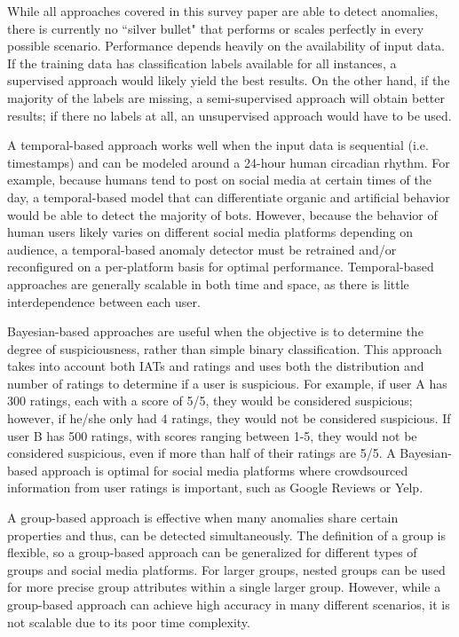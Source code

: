 \documentclass[11pt, oneside]{article}   	%
\begin{document}
\quad While all approaches covered in this survey paper are able to detect anomalies, there is currently no ``silver bullet" that performs or scales perfectly in every possible scenario.
Performance depends heavily on the availability of input data.
If the training data has classification labels available for all instances, a supervised approach would likely yield the best results.
On the other hand, if the majority of the labels are missing, a semi-supervised approach will obtain better results; if there no labels at all, an unsupervised approach would have to be used.

\quad A temporal-based approach works well when the input data is sequential (i.e. timestamps) and can be modeled around a 24-hour human circadian rhythm.
For example, because humans tend to post on social media at certain times of the day, a temporal-based model that can differentiate organic and artificial behavior would be able to detect the majority of bots.
However, because the behavior of human users likely varies on different social media platforms depending on audience, a temporal-based anomaly detector must be retrained and/or reconfigured on a per-platform basis for optimal performance.
Temporal-based approaches are generally scalable in both time and space, as there is little interdependence between each user.

\quad Bayesian-based approaches are useful when the objective is to determine the degree of suspiciousness, rather than simple binary classification.
This approach takes into account both IATs and ratings and uses both the distribution and number of ratings to determine if a user is suspicious.
For example, if user A has 300 ratings, each with a score of 5/5, they would be considered suspicious; however, if he/she only had 4 ratings, they would not be considered suspicious.
If user B has 500 ratings, with scores ranging between 1-5, they would not be considered suspicious, even if more than half of their ratings are 5/5.
A Bayesian-based approach is optimal for social media platforms where crowdsourced information from user ratings is important, such as Google Reviews or Yelp.

\quad A group-based approach is effective when many anomalies share certain properties and thus, can be detected simultaneously.
The definition of a group is flexible, so a group-based approach can be generalized for different types of groups and social media platforms.
For larger groups, nested groups can be used for more precise group attributes within a single larger group.
However, while a group-based approach can achieve high accuracy in many different scenarios, it is not scalable due to its poor time complexity.
\end{document}
